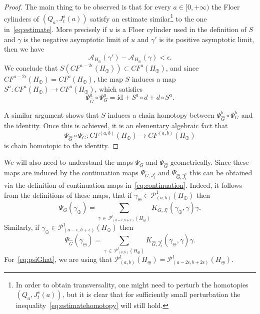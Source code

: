 \documentclass[AHL,Unicode,longabstracts,published]{cedram}
\newcommand{\rid}{\mathrm{id}}
\newcommand{\clP}{\mathcal{P}}
\newcommand{\clA}{\mathcal{A}}
\begin{document}
\begin{proof}
The main thing to be observed is that for every $a\in [0,+\infty)$ the Floer cylinders of $(Q_a,J^s_t(a))$ satisfy an estimate similar\footnote{ In order to obtain transversality, one might need to perturb the homotopies $(Q_a,J^s_t(a))$, but it is clear that for sufficiently small perturbation the inequality~\eqref{eq:estimatehomotopy} will still hold.} to the one in~\eqref{eq:estimate}. More precisely if $u$ is a Floer cylinder used in the definition of $S$ and $\gamma$ is the negative asymptotic limit of $u$ and $\gamma'$ is its positive asymptotic limit, then we have
\begin{equation}\label{eq:estimatehomotopy}
\clA_{H_\oplus}(\gamma') - \clA_{H_\oplus}(\gamma) < \epsilon.
\end{equation}
We conclude that $S(CF^{a-2\epsilon}(H_\oplus)) \subset CF^{a}(H_\oplus)$, and since $CF^{a-2\epsilon}(H_\oplus) = CF^{a}(H_\oplus)$, the map $S$ induces a map $S^a: CF^{a}(H_\oplus) \to CF^{a}(H_\oplus) $, which satisfies
\[
\Psi_{\widehat{G}}^a\circ \Psi_G^a = \rid + S^a\circ d + d \circ S^a.
\]

A similar argument shows that $S$ induces a chain homotopy between $\Psi_{\widehat{G}}^b\circ \Psi_G^b$ and the identity. Once this is achieved, it is an elementary algebraic fact that
\[
\Psi_{\widehat{G}} \circ \Psi_G: CF^{(a,b)}(H_\oplus) \to CF^{(a,b)}(H_\oplus)
\]
is chain homotopic to the identity.
\end{proof}


We will also need to understand the maps $\Psi_G$ and $\Psi_{\widehat{G}}$ geometrically. Since these maps are induced by the continuation maps $\Psi_{G,J^s_t}$ and $\Psi_{\widehat{G},\widehat{J}^s_t}$ this can be obtained via the definition of continuation maps in~\eqref{eq:continuation}. Indeed, it follows from the definitions of these maps, that if $\gamma_{\oplus} \in \clP^1_{(a,b)}(H_\oplus)$ then
\begin{equation}\label{eq:psiG}
\Psi_G(\gamma_\oplus) = \sum_{\gamma\,\in\, \clP^1_{(a-\epsilon,b+\epsilon)}(H_\ominus)} K_{G,J^s_t}(\gamma_\oplus,\gamma)\gamma.
\end{equation}
Similarly, if $\gamma_{\ominus} \in \clP^1_{(a-\epsilon,b+\epsilon)}(H_\ominus)$ then
\begin{equation}\label{eq:psiGhat}
\Psi_{\widehat{G}}(\gamma_\ominus) = \sum_{\gamma \,\in\,\clP^1_{(a,b)}(H_\oplus)} K_{\widehat{G},\widehat{J}^s_t}(\gamma_\ominus,\gamma)\gamma.
\end{equation}
For~\eqref{eq:psiGhat}, we are using that $\clP^1_{(a,b)}(H_\oplus) = \clP^1_{(a-2\epsilon,b+2\epsilon)}(H_\oplus)$.
\end{document}
